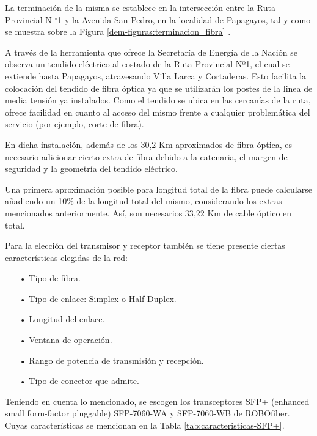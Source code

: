 
La terminación de la misma se establece en la intersección entre la Ruta Provincial N $^{\circ}$1 y la Avenida San Pedro, en la localidad de Papagayos, tal y como se muestra sobre la Figura \ref{dem-figuras:terminacion_fibra} .



A través de la herramienta que ofrece la Secretaría de Energía de la Nación se observa un tendido eléctrico al costado de la Ruta Provincial Nº1, el cual se extiende hasta Papagayos, atravesando Villa Larca y Cortaderas. Esto facilita la colocación del tendido de fibra óptica ya que se utilizarán los postes de la linea de media tensión ya instalados.
Como el tendido se ubica en las cercanías de la ruta, ofrece facilidad en cuanto al acceso del mismo frente a cualquier problemática del servicio (por ejemplo, corte de fibra).



En dicha instalación, además de los 30,2 Km aproximados de fibra óptica, es necesario adicionar cierto extra de fibra debido a la catenaria, el margen de seguridad y la geometría del tendido eléctrico.

Una primera aproximación posible para longitud total de la fibra puede calcularse añadiendo un 10\% de la longitud total del mismo, considerando los extras mencionados anteriormente. Así, son necesarios 33,22 Km de cable óptico en total.





Para la elección del transmisor y receptor también se tiene presente ciertas características elegidas de la red:

\begin{enumerate}
\item[•]Tipo de fibra.
\item[•]Tipo de enlace: Simplex o Half Duplex.
\item[•]Longitud del enlace.
\item[•]Ventana de operación.
\item[•]Rango de potencia de transmisión y recepción.
\item[•]Tipo de conector que admite.
\end{enumerate}


Teniendo en cuenta lo mencionado, se escogen los transceptores SFP+ (enhanced small form-factor pluggable) SFP-7060-WA y SFP-7060-WB de ROBOfiber. Cuyas características se mencionan en la Tabla \ref{tab:caracteristicas-SFP+}.




